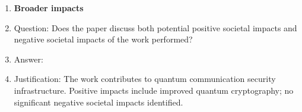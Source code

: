 \documentclass{article}
\begin{document}
\begin{enumerate}
\item {\bf Broader impacts}
    \item[] Question: Does the paper discuss both potential positive societal impacts and negative societal impacts of the work performed?
    \item[] Answer: \answerYes{}
    \item[] Justification: The work contributes to quantum communication security infrastructure. Positive impacts include improved quantum cryptography; no significant negative societal impacts identified.

\end{enumerate}
\end{document}
